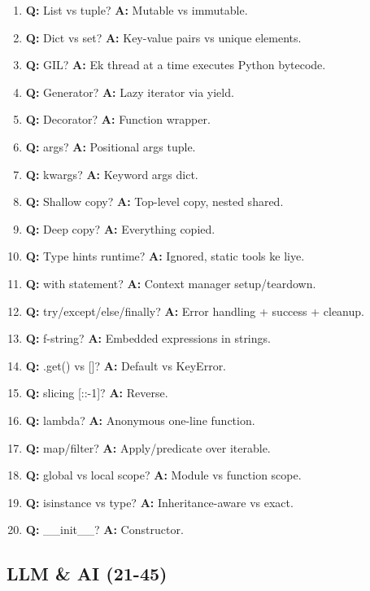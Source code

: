 \begin{enumerate}[label=\arabic*.]
\item \textbf{Q:} List vs tuple? \textbf{A:} Mutable vs immutable.
\item \textbf{Q:} Dict vs set? \textbf{A:} Key-value pairs vs unique elements.
\item \textbf{Q:} GIL? \textbf{A:} Ek thread at a time executes Python bytecode.
\item \textbf{Q:} Generator? \textbf{A:} Lazy iterator via yield.
\item \textbf{Q:} Decorator? \textbf{A:} Function wrapper.
\item \textbf{Q:} \*args? \textbf{A:} Positional args tuple.
\item \textbf{Q:} \*\*kwargs? \textbf{A:} Keyword args dict.
\item \textbf{Q:} Shallow copy? \textbf{A:} Top-level copy, nested shared.
\item \textbf{Q:} Deep copy? \textbf{A:} Everything copied.
\item \textbf{Q:} Type hints runtime? \textbf{A:} Ignored, static tools ke liye.
\item \textbf{Q:} with statement? \textbf{A:} Context manager setup/teardown.
\item \textbf{Q:} try/except/else/finally? \textbf{A:} Error handling + success + cleanup.
\item \textbf{Q:} f-string? \textbf{A:} Embedded expressions in strings.
\item \textbf{Q:} .get() vs []? \textbf{A:} Default vs KeyError.
\item \textbf{Q:} slicing [::-1]? \textbf{A:} Reverse.
\item \textbf{Q:} lambda? \textbf{A:} Anonymous one-line function.
\item \textbf{Q:} map/filter? \textbf{A:} Apply/predicate over iterable.
\item \textbf{Q:} global vs local scope? \textbf{A:} Module vs function scope.
\item \textbf{Q:} isinstance vs type? \textbf{A:} Inheritance-aware vs exact.
\item \textbf{Q:} \_\_init\_\_? \textbf{A:} Constructor.
\end{enumerate}

\subsection{LLM \& AI (21-45)}

